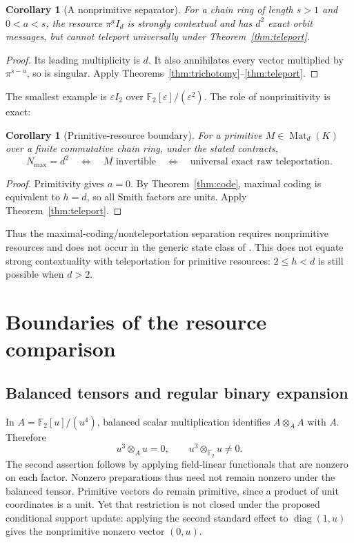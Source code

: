 \documentclass[11pt]{article}
\newtheorem{corollary}[theorem]{Corollary}
\theoremstyle{definition}\newtheorem{definition}[theorem]{Definition}
\theoremstyle{remark}\newtheorem{remark}[theorem]{Remark}
\newcommand{\F}{\mathbb F}
\newcommand{\A}{\F_2[u]/(u^4)}
\DeclareMathOperator{\Mat}{Mat}
\DeclareMathOperator{\diag}{diag}
\begin{document}
\begin{corollary}[A nonprimitive separator]\label{cor:separator}
For a chain ring of length $s>1$ and $0<a<s$, the resource $\pi^a I_d$ is strongly contextual and has $d^2$ exact orbit messages, but cannot teleport universally under Theorem~\ref{thm:teleport}.
\end{corollary}
\begin{proof}
Its leading multiplicity is $d$. It also annihilates every vector multiplied by $\pi^{s-a}$, so is singular. Apply Theorems~\ref{thm:trichotomy}--\ref{thm:teleport}.
\end{proof}
The smallest example is $\varepsilon I_2$ over $\F_2[\varepsilon]/(\varepsilon^2)$. The role of nonprimitivity is exact:
\begin{corollary}[Primitive-resource boundary]\label{cor:primitive}
For a primitive $M\in\Mat_d(K)$ over a finite commutative chain ring, under the stated contracts,
\[
N_{\max}=d^2\quad\Longleftrightarrow\quad M\text{ invertible}
\quad\Longleftrightarrow\quad\text{universal exact raw teleportation}.
\]
\end{corollary}
\begin{proof}
Primitivity gives $a=0$. By Theorem~\ref{thm:code}, maximal coding is equivalent to $h=d$, so all Smith factors are units. Apply Theorem~\ref{thm:teleport}.
\end{proof}
Thus the maximal-coding/nonteleportation separation requires nonprimitive resources and does not occur in the generic state class of \cite{deBeaudrap2014}. This does not equate strong contextuality with teleportation for primitive resources: $2\leq h<d$ is still possible when $d>2$.

\section{Boundaries of the resource comparison}\label{sec:boundaries}
\subsection{Balanced tensors and regular binary expansion}
In $A=\A$, balanced scalar multiplication identifies $A\otimes_A A$ with $A$. Therefore
\[
 u^3\otimes_Au=0,\qquad u^3\otimes_{\F_2}u\ne0.
\]
The second assertion follows by applying field-linear functionals that are nonzero on each factor. Nonzero preparations thus need not remain nonzero under the balanced tensor. Primitive vectors do remain primitive, since a product of unit coordinates is a unit. Yet that restriction is not closed under the proposed conditional support update: applying the second standard effect to $\diag(1,u)$ gives the nonprimitive nonzero vector $(0,u)$.
\end{document}
